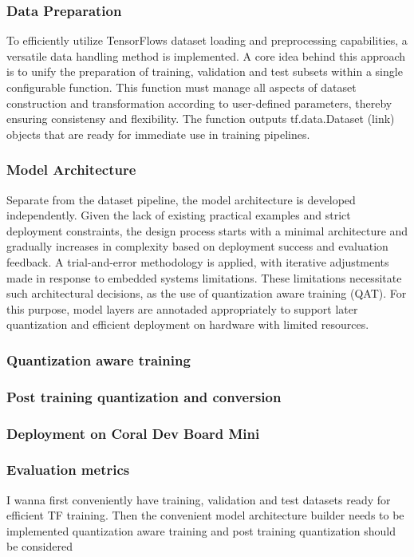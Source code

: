 {\subsubsection{Data Preparation}

To efficiently utilize TensorFlows dataset loading and preprocessing capabilities, a versatile data handling method is implemented. A core idea behind this approach is to unify the preparation of training, validation and test subsets within a single configurable function. This function must manage all aspects of dataset construction and transformation according to user-defined parameters, thereby ensuring consistensy and flexibility. The function outputs tf.data.Dataset (link) objects that are ready for immediate use in training pipelines.

\subsubsection{Model Architecture}

Separate from the dataset pipeline, the model architecture is developed independently. Given the lack of existing practical examples and strict deployment constraints, the design process starts with a minimal architecture and gradually increases in complexity based on deployment success and evaluation feedback. A trial-and-error methodology is applied, with iterative adjustments made in response to embedded systems limitations. These limitations necessitate such architectural decisions, as the use of quantization aware training (QAT). For this purpose, model layers are annotaded appropriately to support later quantization and efficient deployment on hardware with limited resources.

\subsubsection{Quantization aware training}
\subsubsection{Post training quantization and conversion}
\subsubsection{Deployment on Coral Dev Board Mini}
\subsubsection{Evaluation metrics}
I wanna first conveniently have training, validation and test datasets ready for efficient TF training.
Then the convenient model architecture builder needs to be implemented
quantization aware training and post training quantization should be considered

}